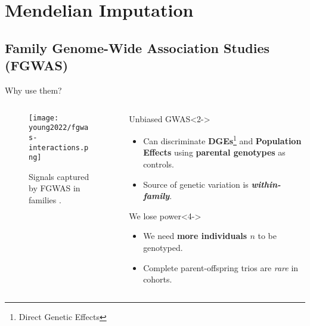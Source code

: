 \section{Mendelian Imputation}

\subsection{Family Genome-Wide Association Studies (FGWAS)}

\begin{frame}{Why use them?}
    \begin{columns}
        \begin{column}{0.45\textwidth}
            \begin{figure}
                \centering
                \texttt{[image: young2022/fgwas-interactions.png]}
                \caption{Signals captured by FGWAS in families \parencite{young2019}.}
                \label{fig:fgwas-genetic-signals}
            \end{figure}
        \end{column}

        \begin{column}{0.45\textwidth}
            \begin{exampleblock}{Unbiased GWAS}<2->
                \begin{itemize}
                    \item<2-> Can discriminate \textbf{DGEs}\footnote{Direct Genetic Effects} and \textbf{Population Effects} using \textbf{parental genotypes} as controls.
                    \item<3-> Source of genetic variation is \textbf{\textit{within-family}}.
                \end{itemize}
            \end{exampleblock}

            \begin{alertblock}{We lose power}<4->
                \begin{itemize}
                    \item<4-> We need \textbf{more individuals $n$} to be genotyped.
                    \item<5-> Complete parent-offspring trios are \textit{rare} in cohorts.
                \end{itemize} 
            \end{alertblock}
        \end{column}
    \end{columns}
\end{frame}


